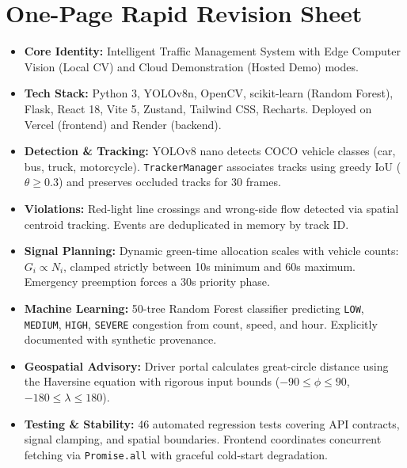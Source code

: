 \section{One-Page Rapid Revision Sheet}
\label{sec:glossary_rapid_sheet}

\begin{tcolorbox}[colback=slate!5,colframe=navy,title=\textbf{BENGALURUTRAFFICAI --- ONE-PAGE RAPID REVISION SHEET}]
\small
\begin{itemize}[leftmargin=*]
    \item \textbf{Core Identity:} Intelligent Traffic Management System with Edge Computer Vision (Local CV) and Cloud Demonstration (Hosted Demo) modes.
    \item \textbf{Tech Stack:} Python 3, YOLOv8n, OpenCV, scikit-learn (Random Forest), Flask, React 18, Vite 5, Zustand, Tailwind CSS, Recharts. Deployed on Vercel (frontend) and Render (backend).
    \item \textbf{Detection \& Tracking:} YOLOv8 nano detects COCO vehicle classes (car, bus, truck, motorcycle). \texttt{TrackerManager} associates tracks using greedy IoU ($\theta \ge 0.3$) and preserves occluded tracks for 30 frames.
    \item \textbf{Violations:} Red-light line crossings and wrong-side flow detected via spatial centroid tracking. Events are deduplicated in memory by track ID.
    \item \textbf{Signal Planning:} Dynamic green-time allocation scales with vehicle counts: $G_i \propto N_i$, clamped strictly between 10s minimum and 60s maximum. Emergency preemption forces a 30s priority phase.
    \item \textbf{Machine Learning:} 50-tree Random Forest classifier predicting \texttt{LOW}, \texttt{MEDIUM}, \texttt{HIGH}, \texttt{SEVERE} congestion from count, speed, and hour. Explicitly documented with synthetic provenance.
    \item \textbf{Geospatial Advisory:} Driver portal calculates great-circle distance using the Haversine equation with rigorous input bounds ($-90 \le \phi \le 90$, $-180 \le \lambda \le 180$).
    \item \textbf{Testing \& Stability:} 46 automated regression tests covering API contracts, signal clamping, and spatial boundaries. Frontend coordinates concurrent fetching via \texttt{Promise.all} with graceful cold-start degradation.
\end{itemize}
\end{tcolorbox}

